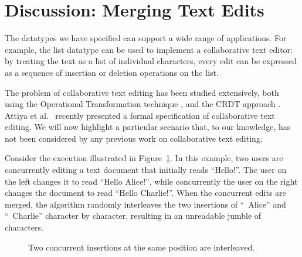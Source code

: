 \section{Discussion: Merging Text Edits}\label{sec:bad-merge}

The datatypes we have specified can support a wide range of applications.
For example, the list datatype can be used to implement a collaborative text editor: by treating the text as a list of individual characters, every edit can be expressed as a sequence of insertion or deletion operations on the list.

The problem of collaborative text editing has been studied extensively, both using the Operational Transformation technique \cite{Ellis:1989ue,Nichols:1995fd,Ressel:1996wx,Sun:1998un,Sun:1998vf,Suleiman:1997gl,Suleiman:1998eu,Vidot:2000ch,Imine:2003ks,Li:2004er,Li:2008hw,Oster:2006tr}, and the CRDT approach \cite{Roh:2011dw,Preguica:2009fz,Oster:2006wj,Weiss:2010hx,Nedelec:2013ky,Nedelec:2016eo}.
Attiya et al.~\cite{Attiya:2016kh} recently presented a formal specification of collaborative text editing.
We will now highlight a particular scenario that, to our knowledge, has not been considered by any previous work on collaborative text editing.

Consider the execution illustrated in Figure~\ref{fig:bad-merge}.
In this example, two users are concurrently editing a text document that initially reads ``Hello!''.
The user on the left changes it to read ``Hello Alice!'', while concurrently the user on the right changes the document to read ``Hello Charlie!''.
When the concurrent edits are merged, the algorithm randomly interleaves the two insertions of ``~Alice'' and ``~Charlie'' character by character, resulting in an unreadable jumble of characters.

\begin{figure}
\centering
{}
\caption{Two concurrent insertions at the same position are interleaved.}\label{fig:bad-merge}
\end{figure}

